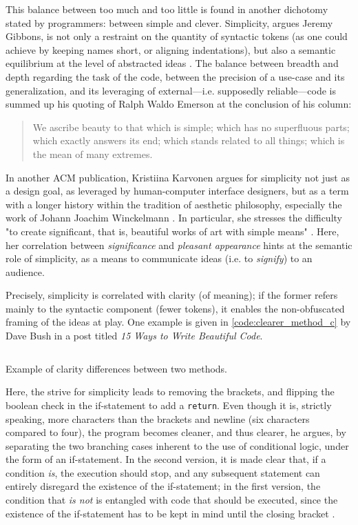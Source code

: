 This balance between too much and too little is found in another dichotomy stated by programmers: between simple and clever. Simplicity, argues Jeremy Gibbons, is not only a restraint on the quantity of syntactic tokens (as one could achieve by keeping names short, or aligning indentations), but also a semantic equilibrium at the level of abstracted ideas \citep{gibbons_beauty_2012}. The balance between breadth and depth regarding the task of the code, between the precision of a use-case and its generalization, and its leveraging of external—i.e. supposedly reliable—code is summed up his quoting of Ralph Waldo Emerson at the conclusion of his column:

\begin{quote}
  We ascribe beauty to that which is simple; which has no superfluous parts; which exactly answers its end; which stands related to all things; which is the mean of many extremes. \citep{gibbons_beauty_2012}
\end{quote}

In another ACM publication, Kristiina Karvonen argues for simplicity not just as a design goal, as leveraged by human-computer interface designers, but as a term with a longer history within the tradition of aesthetic philosophy, especially the work of Johann Joachim Winckelmann \citep{karvonen_beauty_2000}. In particular, she stresses the difficulty "to create significant, that is, beautiful works of art with simple means" \citep{karvonen_beauty_2000}. Here, her correlation between \emph{significance} and \emph{pleasant appearance} hints at the semantic role of simplicity, as a means to communicate ideas (i.e. to \emph{signify}) to an audience.

Precisely, simplicity is correlated with clarity (of meaning); if the former refers mainly to the syntactic component (fewer tokens), it enables the non-obfuscated framing of the ideas at play. One example is given in \ref{code:clearer_method_c} by Dave Bush in a post titled  \emph{15 Ways to Write Beautiful Code}.

\begin{listing}
  \inputminted{c}{./corpus/clearer_method.c}
  \caption{Example of clarity differences between two methods.}
  \label{code:clearer_method_c}
\end{listing}

Here, the strive for simplicity leads to removing the brackets, and flipping the boolean check in the if-statement to add a \lstinline{return}. Even though it is, strictly speaking, more characters than the brackets and newline (six characters compared to four), the program becomes cleaner, and thus clearer, he argues, by separating the two branching cases inherent to the use of conditional logic, under the form of an if-statement. In the second version, it is made clear that, if a condition \emph{is}, the execution should stop, and any subsequent statement can entirely disregard the existence of the if-statement; in the first version, the condition that \emph{is not} is entangled with code that should be executed, since the existence of the if-statement has to be kept in mind until the closing bracket \citep{bush_15_2015}.

